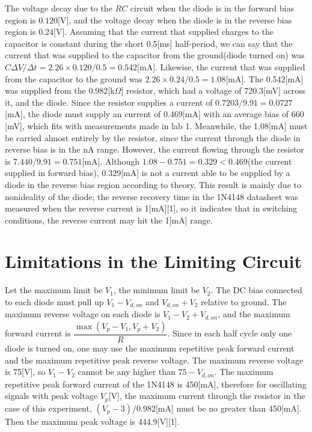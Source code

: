\documentclass[a4paper, itemph]{oblivoir}
\theoremstyle{definition}
\begin{document}
The voltage decay due to the $RC$ circuit when the diode is in the forward bias region is $0.120$[V], and the voltage decay when the diode is in the reverse bias region is $0.24$[V]. Assuming that the current that supplied charges to the capacitor is constant during the short 0.5[ms] half-period, we can say that the current that was supplied to the capacitor from the ground(diode turned on) was $C\Delta V/\Delta t=2.26\times 0.120/0.5=0.542$[mA]. Likewise, the current that was supplied from the capacitor to the ground was $2.26\times 0.24/0.5=1.08$[mA]. The 0.542[mA] was supplied from the 0.982[k$\Omega$] resistor, which had a voltage of 720.3[mV] across it, and the diode. Since the resistor supplies a current of $0.7203/9.91=0.0727$[mA], the diode must supply an current of $0.469$[mA] with an average bias of $660$[mV], which fits with measurements made in lab 1. Meanwhile, the 1.08[mA] must be carried almost entirely by the resistor, since the current through the diode in reverse bias is in the nA range. However, the current flowing through the resistor is $7.440/9.91=0.751$[mA]. Although $1.08-0.751=0.329<0.469$(the current supplied in forward bias), $0.329$[mA] is not a current able to be supplied by a diode in the reverse bias region according to theory. This result is mainly due to nonideality of the diode; the reverse recovery time in the 1N4148 datasheet was measured when the reverse current is 1[mA][1], so it indicates that in switching conditions, the reverse current may hit the 1[mA] range.
\section{Limitations in the Limiting Circuit}

Let the maximum limit be $V_1$, the minimum limit be $V_2$. The DC bias connected to each diode must pull up $V_1-V_{d,on}$ and $V_{d,on}+V_2$ relative to ground. The maximum reverse voltage on each diode is $V_1-V_2+V_{d,on}$, and the maximum forward current is $\dfrac{\max(V_p-V_1, V_p+V_2)}{R}$. Since in each half cycle only one diode is turned on, one may use the maximum repetitive peak forward current and the maximum repetitive peak reverse voltage. The maximum reverse voltage is 75[V], so $V_1-V_2$ cannot be any higher than $75-V_{d,on}$. The maximum repetitive peak forward current of the 1N4148 is 450[mA], therefore for oscillating signals with peak voltage $V_p$[V], the maximum current through the resistor in the case of this experiment, $(V_p-3)/0.982$[mA] must be no greater than 450[mA]. Then the maximum peak voltage is 444.9[V][1].
\end{document}
